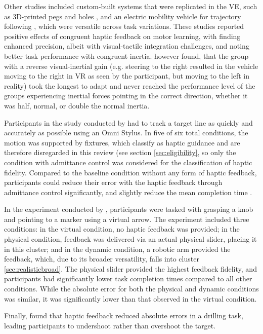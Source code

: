 Other studies included custom-built systems that were replicated in the VE, such as 3D-printed pegs and holes \cite{Mohanty2023}, and an electric mobility vehicle for trajectory following \cite{Macuga2019}, which were versatile across task variations. These studies reported positive effects of congruent haptic feedback on motor learning, with \cite{Mohanty2023} finding enhanced precision, albeit with visual-tactile integration challenges, and \cite{Macuga2019} noting better task performance with congruent inertia. \cite{Macuga2019} however found, that the group with a reverse visual-inertial gain (e.g. steering to the right resulted in the vehicle moving to the right in VR as seen by the participant, but moving to the left in reality) took the longest to adapt and never reached the performance level of the groups experiencing inertial forces pointing in the correct direction, whether it was half, normal, or double the normal inertia. 

Participants in the study conducted by \cite{Fehlberg2012} had to track a target line as quickly and accurately as possible using an Omni Stylus. In five of six total conditions, the motion was supported by fixtures, which classify as haptic guidance and are therefore disregarded in this review (see section \ref{sec:eligibility}, so only the condition with admittance control was considered for the classification of haptic fidelity.
Compared to the baseline condition without any form of haptic feedback, participants could reduce their error with the haptic feedback through admittance control significantly, and slightly reduce the mean completion time \cite{Fehlberg2012}.

In the experiment conducted by \cite{Dai2023}, participants were tasked with grasping a knob and pointing to a marker using a virtual arrow. The experiment included three conditions: in the virtual condition, no haptic feedback was provided; in the physical condition, feedback was delivered via an actual physical slider, placing it in this cluster; and in the dynamic condition, a robotic arm provided the feedback, which, due to its broader versatility, falls into cluster \ref{sec:realisticbroad}.
The physical slider provided the highest feedback fidelity, and participants had significantly lower task completion times compared to all other conditions. While the absolute error for both the physical and dynamic conditions was similar, it was significantly lower than that observed in the virtual condition.

Finally, \cite{Grant2019} found that haptic feedback reduced absolute errors in a drilling task, leading participants to undershoot rather than overshoot the target.


